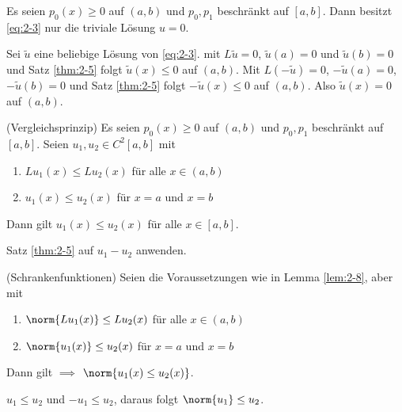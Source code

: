 \begin{lemma}\label{lem:2-6}
  Es seien $p_{0}(x) \geq 0$ auf $(a, b)$ und $p_{0}, p_{1}$ beschränkt auf $[a, b]$. Dann besitzt \eqref{eq:2-3} nur die triviale Lösung $u = 0$. 
\end{lemma}
\begin{beweis}
  Sei $\tilde u$ eine beliebige Lösung von \eqref{eq:2-3}. mit $L \tilde u = 0$, $\tilde u (a) = 0$ und $\tilde u (b) = 0$  und Satz \ref{thm:2-5} folgt $\tilde u (x)\leq 0$ auf $(a, b)$. Mit $L(- \tilde u) = 0$, $-\tilde u(a) = 0$, $-\tilde u(b) = 0$ und Satz \ref{thm:2-5} folgt $-\tilde u(x) \leq 0$ auf $(a, b)$. 
Also $\tilde u(x) = 0$ auf $(a, b)$. 
\end{beweis}
\begin{lemma}\label{lem:2-7}(Vergleichsprinzip)
  Es seien $p_{0}(x) \geq 0$ auf $(a, b)$ und $p_{0}, p_{1}$ beschränkt auf $[a, b]$. Seien $u_{1}, u_{2} \in C^{2}[a, b]$ mit
  \begin{enumerate}
  \item $Lu_{1}(x) \leq Lu_{2}(x)$ für alle $x \in (a, b)$
  \item $u_{1}(x)\leq u_{2}(x)$ für $x = a$ und $x = b$
  \end{enumerate}
Dann gilt $u_{1}(x)\leq u_{2}(x)$ für alle $x \in [a, b]$. 
\end{lemma}
\begin{beweis}
  Satz \ref{thm:2-5} auf $u_{1} - u_{2}$ anwenden. 
\end{beweis}
\begin{lemma}\label{lem:2-8} (Schrankenfunktionen)
  Seien die Voraussetzungen wie in Lemma \ref{lem:2-8}, aber mit
  \begin{enumerate}
  \item $\norm{Lu_{1}(x)} \leq Lu_{2}(x)$ für alle $x \in (a, b)$ 
  \item $\norm{u_{1}(x)}\leq u_{2}(x)$ für $x = a$ und $x = b$
  \end{enumerate}
Dann gilt $\implies$ $\norm{u_{1}(x)\leq u_{2}(x)}$. 
\end{lemma}
\begin{beweis}
  $u_{1}\leq u_{2}$ und $-u_{1} \leq u_{2}$, daraus folgt $\norm{u_{1}}\leq u_{2}$. 
\end{beweis}
